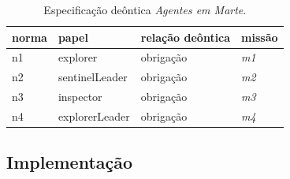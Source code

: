 \begin{table}[ht]
\centering
\caption{Especificação deôntica \textit{Agentes em Marte}. \cite{zatelli2013smadas}}
\label{tab:marte-deontica}
\begin{tabular}{@{}llll@{}}
\toprule
norma   & papel         & relação deôntica  & missão                    \\ \midrule
n1      & explorer          & obrigação         & \textit{m1}               \\
n2      & sentinelLeader    & obrigação         & \textit{m2}               \\
n3      & inspector         & obrigação         & \textit{m3}               \\
n4      & explorerLeader    & obrigação         & \textit{m4}               \\
\bottomrule
\end{tabular}
\end{table}
  
\subsection{Implementação}